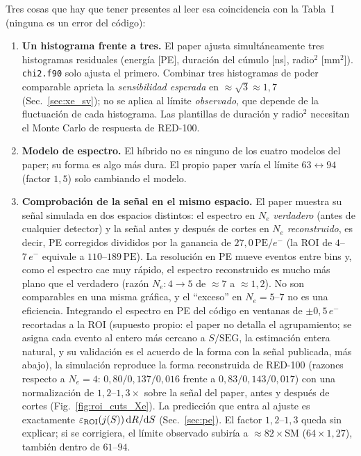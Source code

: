 \documentclass[11pt,a4paper]{article}
\newcommand{\Ne}{N_{e}}
\newcommand{\code}[1]{\texttt{#1}}
\newcommand{\dd}{\mathrm{d}}
\begin{document}
Tres cosas que hay que tener presentes al leer esa coincidencia con la
Tabla~I (ninguna es un error del c\'odigo):
\begin{enumerate}\itemsep2pt
  \item \textbf{Un histograma frente a tres.} El paper ajusta simult\'aneamente
    tres histogramas residuales (energ\'ia [PE], duraci\'on del c\'umulo [ns],
    radio$^{2}$ [mm$^{2}$]). \code{chi2.f90} solo ajusta el primero. Combinar
    tres histogramas de poder comparable aprieta la \emph{sensibilidad esperada}
    en $\approx\sqrt{3}\approx 1{,}7$ (Sec.~\ref{sec:xe_sv}); no se aplica al
    l\'imite \emph{observado}, que depende de la fluctuaci\'on de cada
    histograma. Las plantillas de duraci\'on y radio$^{2}$ necesitan el Monte
    Carlo de respuesta de RED-100.
  \item \textbf{Modelo de espectro.} El h\'ibrido no es ninguno de los cuatro
    modelos del paper; su forma es algo m\'as dura. El propio paper var\'ia el
    l\'imite $63\leftrightarrow 94$ (factor $1{,}5$) solo cambiando el modelo.
  \item \textbf{Comprobaci\'on de la se\~nal en el mismo espacio.} El paper
    muestra su se\~nal simulada en dos espacios distintos: el espectro en $\Ne$
    \emph{verdadero} (antes de cualquier detector) y la se\~nal antes y despu\'es
    de cortes en $\Ne$ \emph{reconstruido}, es decir, PE corregidos divididos por
    la ganancia de $27{,}0\,\mathrm{PE}/e^-$ (la ROI de $4$--$7\,e^-$ equivale a
    $110$--$189\,\mathrm{PE}$). La resoluci\'on en PE mueve eventos entre bins y,
    como el espectro cae muy r\'apido, el espectro reconstruido es mucho m\'as
    plano que el verdadero (raz\'on $\Ne\!:\!4\!\to\!5$ de $\approx7$ a
    $\approx1{,}2$). No son comparables en una misma gr\'afica, y el ``exceso''
    en $\Ne=5$--$7$ no es una eficiencia. Integrando el espectro en PE del
    c\'odigo en ventanas de $\pm0{,}5\,e^-$ recortadas a la ROI (supuesto propio:
    el paper no detalla el agrupamiento; se asigna cada evento al entero m\'as cercano a $S/\mathrm{SEG}$, la estimaci\'on
    entera natural, y su validaci\'on es el acuerdo de la forma con la se\~nal
    publicada, m\'as abajo), la simulaci\'on reproduce la
    forma reconstruida de RED-100 (razones respecto a $\Ne=4$:
    $0{,}80/0{,}137/0{,}016$ frente a $0{,}83/0{,}143/0{,}017$) con una
    normalizaci\'on de $1{,}2$--$1{,}3\times$ sobre la se\~nal del paper, antes y
    despu\'es de cortes (Fig.~\ref{fig:roi_cuts_Xe}). La predicci\'on que entra al
    ajuste es exactamente $\varepsilon_{\rm ROI}(j(S))\,\dd R/\dd S$
    (Sec.~\ref{sec:pe}). El factor $1{,}2$--$1{,}3$ queda sin explicar; si se
    corrigiera, el l\'imite observado subir\'ia a $\approx 82\times$SM
    ($64\times1{,}27$), tambi\'en dentro de $61$--$94$.
\end{enumerate}
\end{document}

